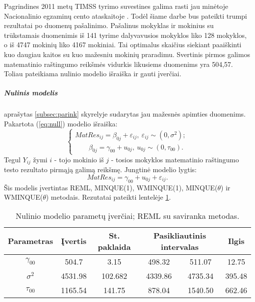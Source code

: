 \documentclass[12pt,a4paper]{article}
\begin{document}
\indent Pagrindines 2011 metų TIMSS tyrimo suvestines galima rasti jau minėtoje Nacionalinio egzaminų cento ataskaitoje \cite{timss2011lt}. Todėl šiame darbe bus pateikti trumpi rezultatai po duomenų pašalinimo. Pašalinus mokyklas ir mokinius su trūkstamais duomenimis iš 141 tyrime dalyvavusios mokyklos liko 128 mokyklos, o iš 4747 mokinių liko 4167 mokiniai. Tai optimalus skaičius siekiant paaiškinti kuo daugiau kaitos su kuo mažesniu mokinių praradimu. Svertinis pirmos galimos matematinio raštingumo reikšmės vidurkis likusiems duomenims yra 504,57. Toliau pateikiama nulinio modelio išraiška ir gauti įverčiai.

\subparagraph{Nulinis modelis} aprašytas \ref{subsec:parink} skyrelyje sudarytas jau mažesnės apimties duomenims. Pakartota (\ref{eq:null}) modelio išraiška:
\begin{equation}
\left\{
\begin{array}{l}
MatRes_{ij}=\beta_{0j}+\varepsilon_{ij}, \ \varepsilon_{ij}\sim (0, \sigma^2);\\
\  \ \ \ \ \ \ \ \ \beta_{0j}=\gamma_{00}+u_{0j}, \ u_{0j}\sim (0, \tau_{00}).
\end{array} \right.
\end{equation}
Tegul $Y_{ij}$ žymi $i$ - tojo mokinio iš $j$ - tosios mokyklos matematinio raštingumo testo rezultato pirmąją galimą reikšmę. Jungtinė modelio lygtis:
\[
MatRes_{ij}=\gamma_{00}+u_{0j}+\varepsilon_{ij}.
\]
Šis modelis įvertintas REML, MINQUE(1), WMINQUE(1), MINQUE($\theta$) ir WMINQUE($\theta$) metodais. Rezutatai pateikti lentelėje \ref{table:null}. 

\begin{small}
\begin{table}[H]
\label{table:null}
\centering
\begin{tabular}{c|cc|cc|c}
\hline
Parametras & Įvertis & St. paklaida & \multicolumn{2}{c|}{Pasikliautinis intervalas}&Ilgis\\
\hline
$\gamma_{00}$ &504.7&3.15&498.32&511.07&12.75\\
$\sigma^2$ &4531.98&102.682&4339.86&4735.34&395.48\\
$\tau_{00}$&1165.54&141.75&878.04&1540.50&662.46\\
\hline
\end{tabular}
\caption{Nulinio modelio parametų įverčiai; REML su saviranka metodas.}
\end{table}
\end{small}
\end{document}
